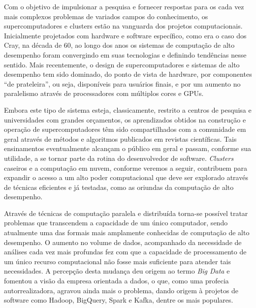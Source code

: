 \documentclass[english,brazilian]{UNISINOSmonografia} %
\begin{document}


Com o objetivo de impulsionar a pesquisa e fornecer respostas para os cada vez mais complexos problemas de variados campos do conhecimento, os supercomputadores e clusters estão na vanguarda dos projetos computacionais.
Inicialmente projetados com hardware e software específico, como era o caso dos Cray, na década de 60, ao longo dos anos os sistemas de computação de alto desempenho foram convergindo em suas tecnologias e definindo tendências nesse sentido.
Mais recentemente, o design de supercomputadores e sistemas de alto desempenho tem sido dominado, do ponto de vista de hardware, por componentes ``de prateleira'', ou seja, disponíveis para usuários finais, e por um aumento no paralelismo através de processadores com múltiplos cores e GPUs.


Embora este tipo de sistema esteja, classicamente, restrito a centros de pesquisa e universidades com grandes orçamentos, os aprendizados obtidos na construção e operação de supercomputadores têm sido compartilhados com a comunidade em geral através de métodos e algoritmos publicados em revistas científicas.
Tais ensinamentos eventualmente alcançam o público em geral e passam, conforme sua utilidade, a se tornar parte da rotina do desenvolvedor de software.
\textit{Clusters} caseiros e a computação em nuvem, conforme veremos a seguir, contribuem para expandir o acesso a um alto poder computacional que deve ser explorado através de técnicas eficientes e já testadas, como as oriundas da computação de alto desempenho.


Através de técnicas de computação paralela e distribuída torna-se possível tratar problemas que transcendem a capacidade de um único computador, sendo atualmente uma das formais mais amplamente conhecidas de computação de alto desempenho.
O aumento no volume de dados, acompanhado da necessidade de análises cada vez mais profundas fez com que a capacidade de processamento de um único recurso computacional não fosse mais suficiente para atender tais necessidades.
A percepção desta mudança deu origem ao termo \textit{Big Data} e fomentou a visão da empresa orientada a dados, o que, como uma profecia autorrealizadora, agravou ainda mais o problema, dando origem à projetos de software como Hadoop, BigQuery, Spark e Kafka, dentre os mais populares.
\end{document}
